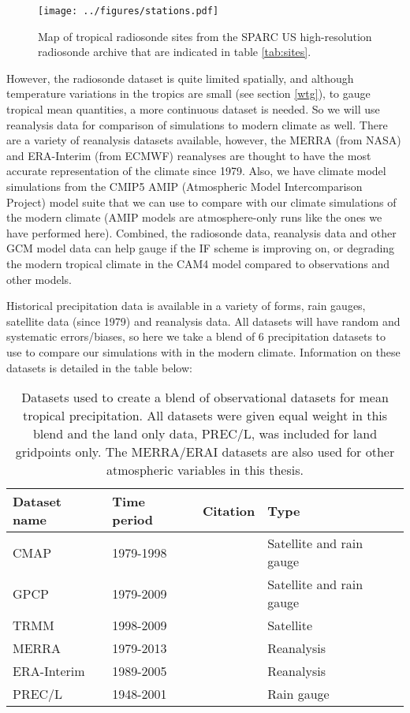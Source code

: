 \documentclass[letterpaper,12pt,titlepage,oneside,final]{book}
\begin{document}
\begin{figure}[H]
\centering
\noindent\texttt{[image: ../figures/stations.pdf]}\hfill
\caption{\footnotesize Map of tropical radiosonde sites from the SPARC US high-resolution radiosonde archive that are indicated in table \ref{tab:sites}.}
\label{fig:stations}
\end{figure}

However, the radiosonde dataset is quite limited spatially, and although temperature variations in the tropics are small (see section \ref{wtg}), to gauge tropical mean quantities, a more continuous dataset is needed. So we will use reanalysis data for comparison of simulations to modern climate as well. There are a variety of reanalysis datasets available, however, the MERRA (from NASA) and ERA-Interim (from ECMWF) reanalyses are thought to have the most accurate representation of the climate since 1979. Also, we have climate model simulations from the CMIP5 AMIP (Atmospheric Model Intercomparison Project) model suite \citep{taylor_overview_2011} that we can use to compare with our climate simulations of the modern climate (AMIP models are atmosphere-only runs like the ones we have performed here). Combined, the radiosonde data, reanalysis data and other GCM model data can help gauge if the IF scheme is improving on, or degrading the modern tropical climate in the CAM4 model compared to observations and other models.

Historical precipitation data is available in a variety of forms, rain gauges, satellite data (since 1979) and reanalysis data. All datasets will have random and systematic errors/biases, so here we take a blend of 6 precipitation datasets to use to compare our simulations with in the modern climate. Information on these datasets is detailed in the table below:

\begin{table}[H]
\caption{\footnotesize Datasets used to create a blend of observational datasets for mean tropical precipitation. All datasets were given equal weight in this blend and the land only data, PREC/L, was included for land gridpoints only. The MERRA/ERAI datasets are also used for other atmospheric variables in this thesis.}
\label{tab:precip}
\begin{tabular}{|p{2.75cm}||p{2cm}|p{4cm}|p{4cm}|}
\hline
Dataset name&Time period&Citation&Type\\ \hline
CMAP&1979-1998&\text{\citep{xie_global_1997}}&Satellite and rain gauge\\   \hline
GPCP&1979-2009&\text{\citep{adler_version-2_2003}}&Satellite and rain gauge\\ \hline
TRMM&1998-2009&\text{\citep{liu_tropical_2012}}&Satellite\\ \hline
MERRA&1979-2013&\text{\citep{rienecker_merra:_2011}}&Reanalysis\\ \hline
ERA-Interim&1989-2005&\text{\citep{dee_era-interim_2011}}&Reanalysis\\ \hline
PREC/L&1948-2001&\text{\citep{chen_global_2002}}&Rain gauge\\ \hline
\end{tabular}
\end{table}
\end{document}
